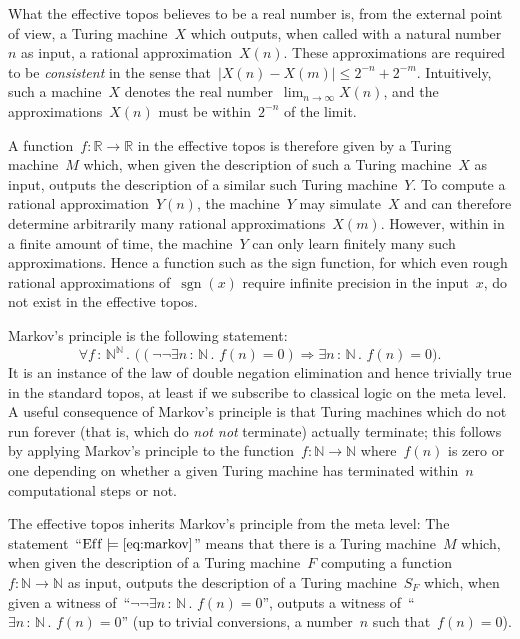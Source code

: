 \documentclass[oneside,reqno]{amsart}
\theoremstyle{definition}
\theoremstyle{plain}
\theoremstyle{remark}
\newcommand{\NN}{\mathbb{N}}
\newcommand{\RR}{\mathbb{R}}
\newcommand{\Eff}{\mathrm{Ef{}f}}
\renewcommand{\_}{\mathpunct{.}\,}
\newcommand{\effective}{ef{}fective\xspace}
\newcommand{\?}{\,{:}\,}
\begin{document}
What the \effective topos believes to be a real number is, from the external
point of view, a Turing machine~$X$ which outputs, when called with a natural
number~$n$ as input, a rational approximation~$X(n)$. These approximations are
required to be \emph{consistent} in the sense that~$|X(n) - X(m)|
\leq 2^{-n} + 2^{-m}$. Intuitively, such a machine~$X$ denotes the real
number~$\lim_{n \to \infty} X(n)$, and the approximations~$X(n)$ must be
within~$2^{-n}$ of the limit.

A function~$f : \RR \to \RR$ in the \effective topos is therefore given by a
Turing machine~$M$ which, when given the description of such a Turing machine~$X$ as
input, outputs the description of a similar such Turing machine~$Y$.
To compute a rational approximation~$Y(n)$, the machine~$Y$ may simulate~$X$
and can therefore determine arbitrarily many rational approximations~$X(m)$.
However, within in a finite amount of time, the machine~$Y$ can only learn finitely many
such approximations. Hence a function such as the sign function, for which
even rough rational approximations of~$\operatorname{sgn}(x)$ require infinite
precision in the input~$x$, do not exist in the \effective topos.


\bigskip
{} Markov's principle is the
following statement:
\begin{equation}\label{eq:markov}\tag{MP}
  \forall f \? \NN^\NN\_ \bigl((\neg\neg\exists n\?\NN\_ f(n) = 0)
  \Longrightarrow \exists n\?\NN\_ f(n) = 0\bigr).
\end{equation}
It is an instance of the law of double negation elimination and hence trivially
true in the standard topos, at least if we subscribe to classical logic on the
meta level. A useful consequence of Markov's principle is that Turing machines
which do not run forever (that is, which do \emph{not not} terminate) actually
terminate; this follows by applying Markov's principle to the function~$f : \NN
\to \NN$ where~$f(n)$ is zero or one depending on whether a given Turing
machine has terminated within~$n$ computational steps or not.

The \effective topos inherits Markov's principle from the meta level:
The statement~``$\Eff \models \text{\eqref{eq:markov}}$'' means that there is a
Turing machine~$M$ which, when given the description of a Turing machine~$F$
computing a function~$f : \NN \to \NN$ as input, outputs the description of a Turing
machine~$S_F$ which, when given a witness of~``$\neg\neg \exists n\?\NN\_ f(n)
= 0$'', outputs a witness of~``$\exists n\?\NN\_ f(n) = 0$'' (up to trivial
conversions, a number~$n$ such that~$f(n) = 0$).
\end{document}
